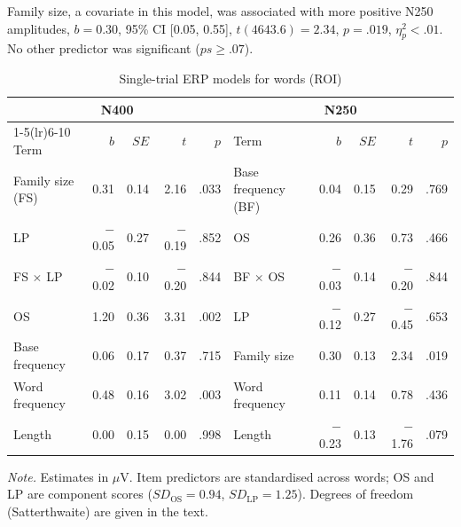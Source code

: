 Family size, a covariate in this model, was associated with more positive N250
amplitudes, $b = 0.30$, 95\% CI [0.05, 0.55], $t(4643.6) = 2.34$, $p = .019$,
$\eta^2_p < .01$. No other predictor was significant ($ps \geq .07$).

\begin{table}[htbp]
\centering
\caption{Single-trial ERP models for words (ROI)}
\label{tab:words}
\begin{tabular}{lrrrr@{\hspace{2em}}lrrrr}
\toprule
\multicolumn{5}{c}{N400} & \multicolumn{5}{c}{N250} \\
\cmidrule(lr){1-5}\cmidrule(lr){6-10}
Term & $b$ & $SE$ & $t$ & $p$ & Term & $b$ & $SE$ & $t$ & $p$ \\
\midrule
Family size (FS)  &  0.31 & 0.14 &  2.16 & .033 & Base frequency (BF) &  0.04 & 0.15 &  0.29 & .769 \\
LP                & $-$0.05 & 0.27 & $-$0.19 & .852 & OS                  &  0.26 & 0.36 &  0.73 & .466 \\
FS $\times$ LP    & $-$0.02 & 0.10 & $-$0.20 & .844 & BF $\times$ OS      & $-$0.03 & 0.14 & $-$0.20 & .844 \\
OS                &  1.20 & 0.36 &  3.31 & .002 & LP                  & $-$0.12 & 0.27 & $-$0.45 & .653 \\
Base frequency    &  0.06 & 0.17 &  0.37 & .715 & Family size         &  0.30 & 0.13 &  2.34 & .019 \\
Word frequency    &  0.48 & 0.16 &  3.02 & .003 & Word frequency      &  0.11 & 0.14 &  0.78 & .436 \\
Length            &  0.00 & 0.15 &  0.00 & .998 & Length              & $-$0.23 & 0.13 & $-$1.76 & .079 \\
\bottomrule
\end{tabular}

\vspace{2pt}
\begin{minipage}{0.95\linewidth}\footnotesize
\textit{Note.} Estimates in $\mu$V. Item predictors are standardised across words;
OS and LP are component scores ($SD_{\text{OS}} = 0.94$, $SD_{\text{LP}} = 1.25$).
Degrees of freedom (Satterthwaite) are given in the text.
\end{minipage}
\end{table}

